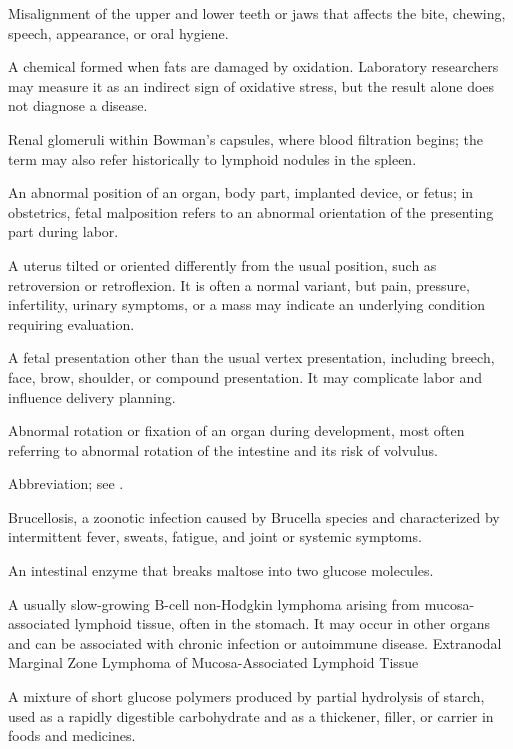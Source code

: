  Misalignment of the upper and lower teeth or jaws that affects the bite, chewing, speech, appearance, or oral hygiene.

 A chemical formed when fats are damaged by oxidation. Laboratory researchers may measure it as an indirect sign of oxidative stress, but the result alone does not diagnose a disease.

 Renal glomeruli within Bowman's capsules, where blood filtration begins; the term may also refer historically to lymphoid nodules in the spleen.

 An abnormal position of an organ, body part, implanted device, or fetus; in obstetrics, fetal malposition refers to an abnormal orientation of the presenting part during labor.

 A uterus tilted or oriented differently from the usual position, such as retroversion or retroflexion. It is often a normal variant, but pain, pressure, infertility, urinary symptoms, or a mass may indicate an underlying condition requiring evaluation.

 A fetal presentation other than the usual vertex presentation, including breech, face, brow,
shoulder, or compound presentation. It may complicate labor and influence delivery planning.

 Abnormal rotation or fixation of an organ during development, most often referring to abnormal rotation of the
intestine and its risk of volvulus.

 Abbreviation; see .

 Brucellosis, a zoonotic infection caused by Brucella species and characterized by intermittent fever, sweats, fatigue, and joint or systemic symptoms.

 An intestinal enzyme that breaks maltose into two glucose molecules.

 A usually slow-growing B-cell non-Hodgkin lymphoma arising from mucosa-associated lymphoid tissue, often in the stomach. It may occur in other organs and can be associated with chronic infection or autoimmune disease.
\synonyms
Extranodal Marginal Zone Lymphoma of Mucosa-Associated Lymphoid Tissue

 A mixture of short glucose polymers produced by partial hydrolysis of starch, used as a rapidly digestible carbohydrate and as a thickener, filler, or carrier in foods and medicines.

